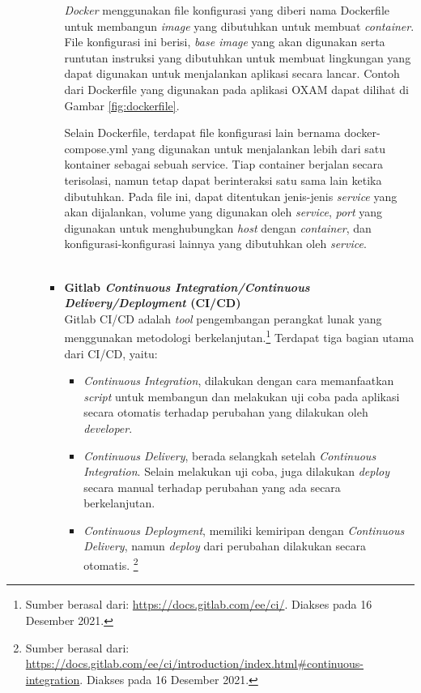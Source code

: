 \documentclass[a4paper,twoside]{article}
\begin{document}
\begin{enumerate}
\begin{itemize}
\begin{itemize}
                \textit{Docker} menggunakan file konfigurasi yang diberi nama Dockerfile untuk membangun \textit{image} yang dibutuhkan untuk membuat \textit{container}. File konfigurasi ini berisi, \textit{base image} yang akan digunakan serta runtutan instruksi yang dibutuhkan untuk membuat lingkungan yang dapat digunakan untuk menjalankan aplikasi secara lancar. Contoh dari Dockerfile yang digunakan pada aplikasi OXAM dapat dilihat di Gambar \ref{fig:dockerfile}.
                
                Selain Dockerfile, terdapat file konfigurasi lain bernama docker-compose.yml yang digunakan untuk menjalankan lebih dari satu kontainer sebagai sebuah service. Tiap container berjalan secara terisolasi, namun tetap dapat berinteraksi satu sama lain ketika dibutuhkan. Pada file ini, dapat ditentukan jenis-jenis \textit{service} yang akan dijalankan, volume yang digunakan oleh \textit{service}, \textit{port} yang digunakan untuk menghubungkan \textit{host} dengan \textit{container}, dan konfigurasi-konfigurasi lainnya yang dibutuhkan oleh \textit{service}.
                \\
                \\
        	\item \textbf{Gitlab \textit{Continuous Integration/Continuous Delivery/Deployment} (CI/CD)}\\
		        \label{gitlab-cicd}
                Gitlab CI/CD adalah \textit{tool} pengembangan perangkat lunak yang menggunakan metodologi berkelanjutan.\footnote{Sumber berasal dari: \url{https://docs.gitlab.com/ee/ci/}. Diakses pada 16 Desember 2021.} Terdapat tiga bagian utama dari CI/CD, yaitu:
        		\begin{itemize}
        		    \item \textit{ Continuous Integration}, dilakukan dengan cara memanfaatkan \textit{script} untuk membangun dan melakukan uji coba pada aplikasi secara otomatis terhadap perubahan yang dilakukan oleh \textit{developer}.
        		    \item \textit{ Continuous Delivery}, berada selangkah setelah \textit{ Continuous Integration}. Selain melakukan uji coba, juga dilakukan \textit{deploy} secara manual terhadap perubahan yang ada secara berkelanjutan.
        		    \item \textit{ Continuous Deployment}, memiliki kemiripan dengan \textit{ Continuous Delivery}, namun \textit{deploy} dari perubahan dilakukan secara otomatis. \footnote{Sumber berasal dari: \url{https://docs.gitlab.com/ee/ci/introduction/index.html\#continuous-integration}. Diakses pada 16 Desember 2021.}
        		\end{itemize}
        		

\end{itemize}
\end{itemize}
\end{enumerate}
\end{document}
